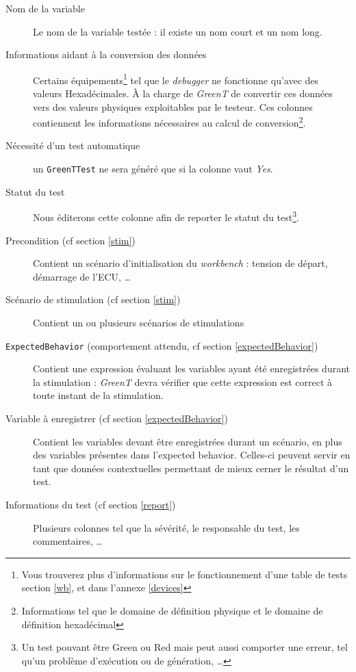\begin{description} 
	\item[Nom de la variable] Le nom de la variable testée : il existe un nom court et un nom long.
	\item[Informations aidant à la conversion des données] Certains équipements\footnote{Vous trouverez plus d'informations sur le fonctionnement d'une table de tests section \ref{wb}, et dans l'annexe \ref{devices}} tel que le \textit{debugger} ne fonctionne qu'avec des
	valeurs Hexadécimales. À la charge de \textit{GreenT} de convertir ces données vers des valeurs physiques exploitables par
	le testeur. Ces colonnes contiennent les informations nécessaires au calcul de conversion\footnote{Informations tel que le
		domaine de définition physique et le domaine de définition hexadécimal}.
	\item[Nécessité d'un test automatique] un \texttt{GreenTTest} ne sera généré que si la colonne vaut \textit{Yes}.
	\item[Statut du test] Nous éditerons cette colonne afin de reporter le statut du test\footnote{Un test pouvant être Green ou Red
		mais peut aussi comporter une erreur, tel qu'un problème d'exécution ou de génération, \ldots}.
	\item[Precondition (cf section \ref{stim})] Contient un scénario d'initialisation du \textit{workbench} : tension de départ,
	démarrage de l'ECU, \ldots
	\item[Scénario de stimulation (cf section \ref{stim})] Contient un ou plusieurs scénarios de stimulations
	\item[\texttt{ExpectedBehavior} (comportement attendu, cf section \ref{expectedBehavior})] Contient une expression évaluant les variables ayant été enregistrées durant la stimulation : \textit{GreenT} devra vérifier que cette expression est correct à toute instant de la stimulation.
	\item[Variable à enregistrer (cf section \ref{expectedBehavior})] Contient les variables devant être enregistrées durant un
	scénario, en plus des variables présentes dans l'expected behavior. Celles-ci peuvent servir en tant que données
	contextuelles permettant de mieux cerner le résultat d'un test.
	\item[Informations du test (cf section \ref{report})] Plusieurs colonnes tel que la sévérité, le responsable du test, les commentaires, \ldots
\end{description}


